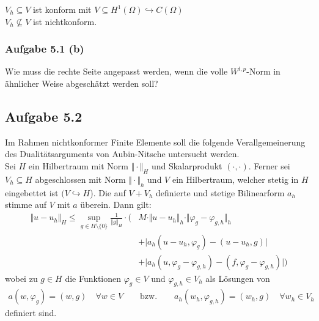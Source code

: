 $V_h\subseteq V$ ist konform mit $V\subseteq H^1(\Omega)\hookrightarrow C(\Omega)$\\
$V_h\not\subseteq V$ ist nichtkonform.

\subsubsection{Aufgabe 5.1 (b)}
Wie muss die rechte Seite angepasst werden, wenn die volle $W^{l,p}$-Norm in ähnlicher Weise abgeschätzt werden soll?

\begin{lösung}
\end{lösung}

\subsection{Aufgabe 5.2}
Im Rahmen nichtkonformer Finite Elemente soll die folgende Verallgemeinerung des Dualitätsarguments von Aubin-Nitsche untersucht werden.\\
Sei $H$ ein Hilbertraum mit Norm $\Vert\cdot\Vert_H$ und Skalarprodukt $(\cdot,\cdot)$. 
Ferner sei $V_h\subseteq H$ abgeschlossen mit Norm $\Vert\cdot\Vert_h$ und $V$ ein Hilbertraum, welcher stetig in $H$ eingebettet ist $(V\hookrightarrow H$). 
Die auf $V+V_h$ definierte und stetige Bilinearform $a_h$ stimme auf $V$ mit $a$ überein. 
Dann gilt:
\begin{align*}
	\Vert u-u_h\Vert_H\leq\sup\limits_{g\in H\setminus\lbrace0\rbrace}\frac{1}{\Vert g\Vert_H}\cdot\Big( &M\cdot\Vert u-u_h\Vert_h\cdot\Vert\varphi_g-\varphi_{g,h}\Vert_h\\
	&+\big|a_h(u-u_h,\varphi_g)-(u-u_h,g)\big|\\
	&+\big|a_h(u,\varphi_g-\varphi_{g,h})-(f,\varphi_g-\varphi_{g,h})\big|\Big)
\end{align*}
wobei zu $g\in H$ die Funktionen $\varphi_g\in V$ und $\varphi_{g,h}\in V_h$ als Lösungen von
\begin{align*}
	a(w,\varphi_g)=(w,g)\quad\forall w\in V\qquad\text{bzw.}\qquad a_h(w_h,\varphi_{g,h})=(w_h,g)\quad\forall w_h\in V_h
\end{align*}
definiert sind.

